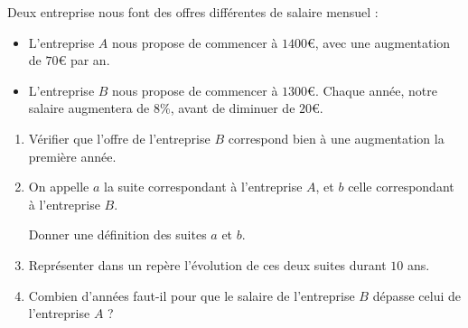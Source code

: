 \documentclass[
	classe=$1^{ere}STI2D$
]{évaluation}
\begin{document}
\begin{exercice}[5]
	Deux entreprise nous font des offres différentes de salaire mensuel :
	\begin{itemize}
		\item L'entreprise $A$ nous propose de commencer à $1400$€, avec une augmentation de $70$€ par an.
		\item L'entreprise $B$ nous propose de commencer à $1300$€. Chaque année, notre salaire augmentera de $8$\%, avant de diminuer de $20$€.
	\end{itemize}
	\begin{enumerate}
		\item Vérifier que l'offre de l'entreprise $B$ correspond bien à une augmentation la première année.
		\item On appelle $a$ la suite correspondant à l'entreprise $A$, et $b$ celle correspondant à l'entreprise $B$.

		      Donner une définition des suites $a$ et $b$.
		\item Représenter dans un repère l'évolution de ces deux suites durant $10$ ans.

		\item Combien d'années faut-il pour que le salaire de l'entreprise $B$ dépasse celui de l'entreprise $A$ ?
	\end{enumerate}
\end{exercice}
\end{document}
